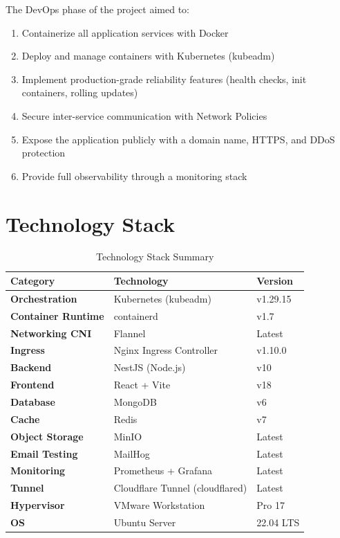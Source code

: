 \documentclass[12pt,a4paper]{report}
\begin{document}
The DevOps phase of the project aimed to:

\begin{enumerate}[leftmargin=1.5cm]
  \item Containerize all application services with Docker
  \item Deploy and manage containers with Kubernetes (kubeadm)
  \item Implement production-grade reliability features (health checks, init containers, rolling updates)
  \item Secure inter-service communication with Network Policies
  \item Expose the application publicly with a domain name, HTTPS, and DDoS protection
  \item Provide full observability through a monitoring stack
\end{enumerate}

\section{Technology Stack}

\begin{table}[H]
  \centering
  \begin{tabular}{>{\bfseries}p{4cm} p{6cm} p{4cm}}
    \toprule
    \textbf{Category} & \textbf{Technology} & \textbf{Version} \\
    \midrule
    Orchestration & Kubernetes (kubeadm) & v1.29.15 \\
    Container Runtime & containerd & v1.7 \\
    Networking CNI & Flannel & Latest \\
    Ingress & Nginx Ingress Controller & v1.10.0 \\
    Backend & NestJS (Node.js) & v10 \\
    Frontend & React + Vite & v18 \\
    Database & MongoDB & v6 \\
    Cache & Redis & v7 \\
    Object Storage & MinIO & Latest \\
    Email Testing & MailHog & Latest \\
    Monitoring & Prometheus + Grafana & Latest \\
    Tunnel & Cloudflare Tunnel (cloudflared) & Latest \\
    Hypervisor & VMware Workstation & Pro 17 \\
    OS & Ubuntu Server & 22.04 LTS \\
    \bottomrule
  \end{tabular}
  \caption{Technology Stack Summary}
\end{table}
\end{document}
